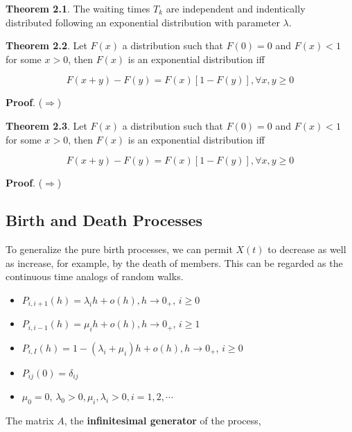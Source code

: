 \documentclass[12pt]{article}
\theoremstyle{nonumberbreak}
\begin{document}
\begin{theorem}
\textbf{Theorem 2.1}. The waiting times $T_k$ are independent and indentically distributed following an exponential distribution with parameter $\lambda$. 
\end{theorem}



\begin{theorem}
\textbf{Theorem 2.2}. Let $F(x)$ a distribution such that $F(0) = 0$ and $F(x) < 1$ for some $x >0 $, then $F(x)$ is an exponential distribution iff

$$
F(x+y) - F(y) = F(x)[1-F(y)], \forall x,y \ge 0
$$
\end{theorem}

\textbf{Proof}. ($\Rightarrow$) 




\begin{theorem}
\textbf{Theorem 2.3}. Let $F(x)$ a distribution such that $F(0) = 0$ and $F(x) < 1$ for some $x >0 $, then $F(x)$ is an exponential distribution iff

$$
F(x+y) - F(y) = F(x)[1-F(y)], \forall x,y \ge 0
$$
\end{theorem}

\textbf{Proof}. ($\Rightarrow$) 




\subsection{Birth and Death Processes}

To generalize the pure birth processes, we can permit $X(t)$ to decrease as well as increase, for example, by the death of members. This can be regarded as the continuous time analogs of random walks. 


\begin{itemize}
	\item $P_{i, i+1}(h) = \lambda_i h + o(h), h \to 0_+$, $i \ge 0$
	\item $P_{i, i-1}(h) = \mu_i h + o(h), h \to 0_+$, $i \ge 1$
	\item $P_{i,I} (h) = 1 -(\lambda_i + \mu_i) h + o(h), h \to 0_+$, $i \ge 0$
	\item $P_{ij} (0) = \delta_{ij}$
	\item $\mu_0 = 0$, $\lambda_0 > 0, \mu_i, \lambda_i > 0, i=1,2,\cdots$
\end{itemize}

The matrix $A$, the \textbf{infinitesimal generator} of the process,
\end{document}
